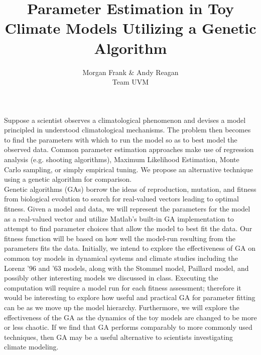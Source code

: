 \documentclass[onecolumn]{article}
\title{Parameter Estimation in Toy Climate Models Utilizing a Genetic Algorithm}
\author{Morgan Frank \& Andy Reagan\\ Team UVM}
\begin{document}
\maketitle
\indent Suppose a scientist observes a climatological phenomenon and devises a model principled in understood climatological mechanisms.
The problem then becomes to find the parameters with which to run the model so as to best model the observed data.
Common parameter estimation approaches make use of regression analysis (e.g. shooting algorithms), Maximum Likelihood Estimation, Monte Carlo sampling, or simply empirical tuning.
We propose an alternative technique using a genetic algorithm for comparison.\\

\indent Genetic algorithms (GAs) borrow the ideas of reproduction, mutation, and fitness from biological evolution to search for real-valued vectors leading to optimal fitness.
Given a model and data, we will represent the parameters for the model as a real-valued vector and utilize Matlab's built-in GA implementation to attempt to find parameter choices that allow the model to best fit the data.
Our fitness function will be based on how well the model-run resulting from the parameters fits the data.
Initially, we intend to explore the effectiveness of GA on common toy models in dynamical systems and climate studies including the Lorenz '96 and '63 models, along with the Stommel model, Paillard model, and possibly other interesting models we discussed in class.
Executing the computation will require a model run for each fitness assessment; therefore it would be interesting to explore how useful and practical  GA for parameter fitting can be as we move up the model hierarchy.
Furthermore, we will explore the effectiveness of the GA as the dynamics of the toy models are changed to be more or less chaotic.
If we find that GA performs comparably to more commonly used techniques, then GA may be a useful alternative to scientists investigating climate modeling.
\end{document}
